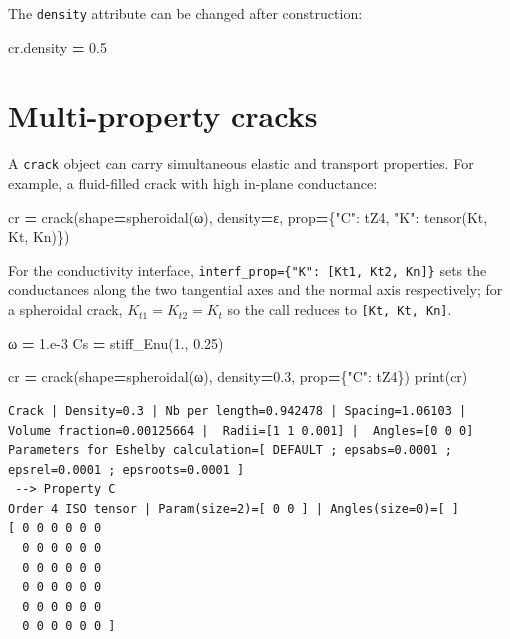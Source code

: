 \documentclass[
  a4paper,
  numbers=noendperiod,
  DIV=12]{scrreprt}
\newenvironment{Shaded}{\begin{snugshade}}{\end{snugshade}}
\newcommand{\BuiltInTok}[1]{#1}
\newcommand{\FloatTok}[1]{\textcolor[rgb]{0.00,0.00,0.81}{#1}}
\newcommand{\NormalTok}[1]{#1}
\newcommand{\OperatorTok}[1]{\textcolor[rgb]{0.81,0.36,0.00}{\textbf{#1}}}
\newcommand{\StringTok}[1]{\textcolor[rgb]{0.31,0.60,0.02}{#1}}
\begin{document}
The \texttt{density} attribute can be changed after construction:

\begin{Shaded}
\begin{Highlighting}[]
\NormalTok{cr.density }\OperatorTok{=} \FloatTok{0.5}
\end{Highlighting}
\end{Shaded}

\section{Multi-property cracks}\label{multi-property-cracks}

A \texttt{crack} object can carry simultaneous elastic and transport
properties. For example, a fluid-filled crack with high in-plane
conductance:

\begin{Shaded}
\begin{Highlighting}[]
\NormalTok{cr }\OperatorTok{=}\NormalTok{ crack(shape}\OperatorTok{=}\NormalTok{spheroidal(ω), density}\OperatorTok{=}\NormalTok{ε,}
\NormalTok{           prop}\OperatorTok{=}\NormalTok{\{}\StringTok{"C"}\NormalTok{: tZ4, }\StringTok{"K"}\NormalTok{: tensor(Kt, Kt, Kn)\})}
\end{Highlighting}
\end{Shaded}

For the conductivity interface,
\texttt{interf\_prop=\{"K":\ {[}Kt1,\ Kt2,\ Kn{]}\}} sets the
conductances along the two tangential axes and the normal axis
respectively; for a spheroidal crack, \(K_{t1} = K_{t2} = K_t\) so the
call reduces to \texttt{{[}Kt,\ Kt,\ Kn{]}}.

\begin{Shaded}
\begin{Highlighting}[]
\NormalTok{ω }\OperatorTok{=} \FloatTok{1.e{-}3}
\NormalTok{Cs }\OperatorTok{=}\NormalTok{ stiff\_Enu(}\FloatTok{1.}\NormalTok{, }\FloatTok{0.25}\NormalTok{)}

\NormalTok{cr }\OperatorTok{=}\NormalTok{ crack(shape}\OperatorTok{=}\NormalTok{spheroidal(ω), density}\OperatorTok{=}\FloatTok{0.3}\NormalTok{,}
\NormalTok{           prop}\OperatorTok{=}\NormalTok{\{}\StringTok{"C"}\NormalTok{: tZ4\})}
\BuiltInTok{print}\NormalTok{(cr)}
\end{Highlighting}
\end{Shaded}

\begin{verbatim}
Crack | Density=0.3 | Nb per length=0.942478 | Spacing=1.06103 | Volume fraction=0.00125664 |  Radii=[1 1 0.001] |  Angles=[0 0 0]
Parameters for Eshelby calculation=[ DEFAULT ; epsabs=0.0001 ; epsrel=0.0001 ; epsroots=0.0001 ]
 --> Property C
Order 4 ISO tensor | Param(size=2)=[ 0 0 ] | Angles(size=0)=[ ]
[ 0 0 0 0 0 0 
  0 0 0 0 0 0 
  0 0 0 0 0 0 
  0 0 0 0 0 0 
  0 0 0 0 0 0 
  0 0 0 0 0 0 ]
\end{verbatim}
\end{document}
